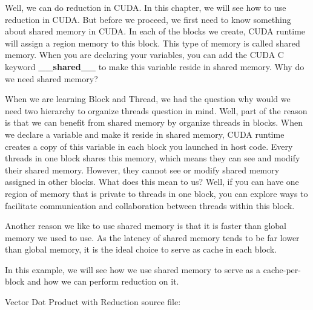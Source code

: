 \documentclass[letterpaper,10pt,openany,oneside]{sphinxmanual}
\begin{document}
Well, we can do reduction in CUDA. In this chapter, we will see how to use reduction in CUDA. But before we proceed, we first need to know something about shared memory in CUDA. In each of the blocks we create, CUDA runtime will assign a region memory to this block. This type of memory is called shared memory. When you are declaring your variables, you can add the CUDA C keyword \textbf{\_\_shared\_\_} to make this variable reside in shared memory. Why do we need shared memory?

When we are learning Block and Thread, we had the question why would we need two hierarchy to organize threads question in mind. Well, part of the reason is that we can benefit from shared memory by organize threads in blocks. When we declare a variable and make it reside in shared memory, CUDA runtime creates a copy of this variable in each block you launched in host code. Every threads in one block shares this memory, which means they can see and modify their shared memory. However, they cannot see or modify shared memory assigned in other blocks. What does this mean to us? Well, if you can have one region of memory that is private to threads in one block, you can explore ways to facilitate communication and collaboration between threads within this block.

Another reason we like to use shared memory is that it is faster than global memory we used to use. As the latency of shared memory tends to be far lower than global memory, it is the ideal choice to serve as cache in each block.

In this example, we will see how we use shared memory to serve as a cache-per-block and how we can perform reduction on it.

Vector Dot Product with Reduction source file:
\end{document}
